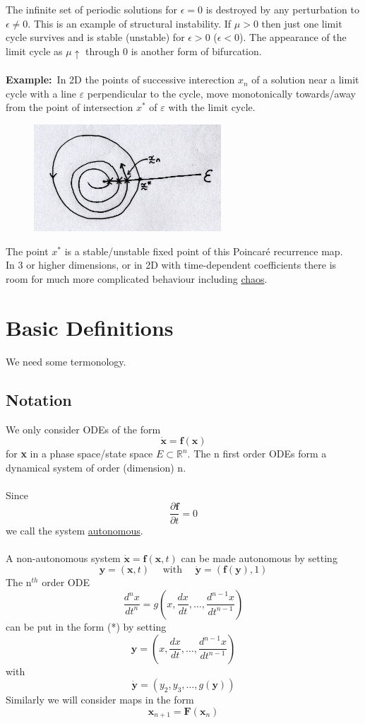 \documentclass{article}
\newcommand{\example}{\textbf{Example:}}                    %
\newcommand{\xeq}[1] { \dot{\bm{ #1 }} = \bm{f}(\bm{ #1}) } %
\begin{document}
\noindent
The infinite set of periodic solutions for $\epsilon = 0$ is destroyed by any 
perturbation to $\epsilon \neq 0$. This is an example of structural instability.
If $\mu > 0$ then just one limit cycle survives and is stable (unstable) for 
$\epsilon >0$ ($\epsilon < 0$). The appearance of the limit cycle as $\mu \uparrow$ 
through $0$ is another form of bifurcation.
\\
\\
\example\ In 2D the points of successive interection $x_n$ of a 
solution near a limit cycle with a line $\varepsilon$ perpendicular to the cycle,
move monotonically towards/away from the point of intersection $x^{*}$ of 
$\varepsilon$ with the limit cycle.
\begin{figure}[H]
\centering
\includegraphics[width=7cm, height=4cm]{fig2.png}
\end{figure}
\noindent
The point $x^{*}$ is a stable/unstable fixed point of this Poincar\'e recurrence
map.
\\
In 3 or higher dimensions, or in 2D with time-dependent coefficients there is 
room for much more complicated behaviour including \underline{chaos}.
\section{Basic Definitions}
We need some termonology.
\subsection{Notation}
We only consider ODEs of the form 
\begin{equation}\tag{*}
\xeq{x}
\end{equation}
for \textbf{x} in a phase space/state space $E \subset \mathbb{R}^{n}$.
The n first order ODEs form a dynamical system of order (dimension) n.
\\
\\
Since
\[ \frac{\partial \textbf{f} } { \partial t} = 0 \]
 we call the system \underline{autonomous}.
\\
\\
A non-autonomous system $\dot{\textbf{x}} = \textbf{f}(\textbf{x} ,t) $ can be
made autonomous by setting
\[ \textbf{y} = ( \textbf{x},t) \quad \mbox{ with } \quad \dot{\textbf{y}} = ( \textbf{f}(\textbf{y}),1) \]
The n$^{th}$ order ODE
\[ \frac{d ^n x}{d t^n} = g \left( x , \frac{d x}{d t} , \dots , \frac{d^{n-1} x}{d t^{n-1}} \right) \]
can be put in the form (*) by setting
\[ \textbf{y} =  \left( x , \frac{d x}{d t} , \dots , \frac{d^{n-1} x}{d t^{n-1}} \right) \]
with 
\[ \dot{\textbf{y}} =  \left( y_2 , y_3 , \dots , g( \textbf{y}) \right) \]
Similarly we will consider maps in the form
\[ \textbf{x}_{n+1} = \textbf{F}(\textbf{x}_n) \]
\end{document}
